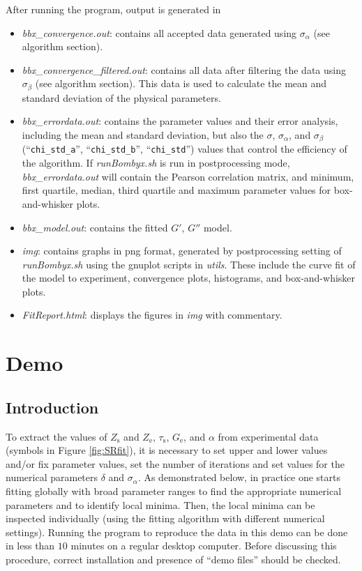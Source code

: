 \documentclass[  superscriptaddress]{revtex4}
\begin{document}
After running the program, output is generated in 
\begin{itemize}
 \item \emph{bbx\_convergence.out}: contains all accepted data generated using $\sigma_\alpha$ (see algorithm section).
 \item \emph{bbx\_convergence\_filtered.out}: contains all data after filtering the data using  $\sigma_\beta$ (see algorithm section). This data is used to calculate the mean and standard deviation of the physical parameters. 
 \item \emph{bbx\_errordata.out}: contains the parameter values and their error analysis, including the mean and standard deviation, but also the $\sigma$, $\sigma_\alpha$, and $\sigma_\beta$ (``\texttt{chi\_std\_a}'', ``\texttt{chi\_std\_b}'', ``\texttt{chi\_std}'') values that control the efficiency of the algorithm. If \emph{runBombyx.sh} is run in postprocessing mode, \emph{bbx\_errordata.out} will contain the Pearson correlation matrix, and minimum, first quartile, median, third quartile and maximum parameter values for box-and-whisker plots.
 \item \emph{bbx\_model.out}: contains the fitted $G'$, $G''$ model.
 \item \emph{img}: contains graphs in png format, generated by postprocessing setting of \emph{runBombyx.sh} using the gnuplot scripts in \emph{utils}. These include the curve fit of the model to experiment, convergence plots, histograms, and box-and-whisker plots.
 \item \emph{FitReport.html}: displays the figures in \emph{img} with commentary.
\end{itemize}



\newpage

\section{Demo}
\subsection{Introduction}

To extract the values of $Z_\mathrm{s}$ and $Z_\mathrm{e}$, $\tau_\mathrm{s}$, $G_\mathrm{e}$, and $\alpha$ from experimental data (symbols in Figure \ref{fig:SRfit}), it is necessary to set upper and lower values and/or fix parameter values, set the number of iterations and set values for the numerical parameters $\delta$ and $\sigma_\alpha$. 
As demonstrated below, in practice one starts fitting globally with broad parameter ranges to find the appropriate numerical parameters and to identify local minima.
Then, the local minima can be inspected individually (using the fitting algorithm with different numerical settings).
Running the program to reproduce the data in this demo can be done in less than $10$ minutes on a regular desktop computer.
Before discussing this procedure, correct installation and presence of ``demo files'' should be checked.
\end{document}
